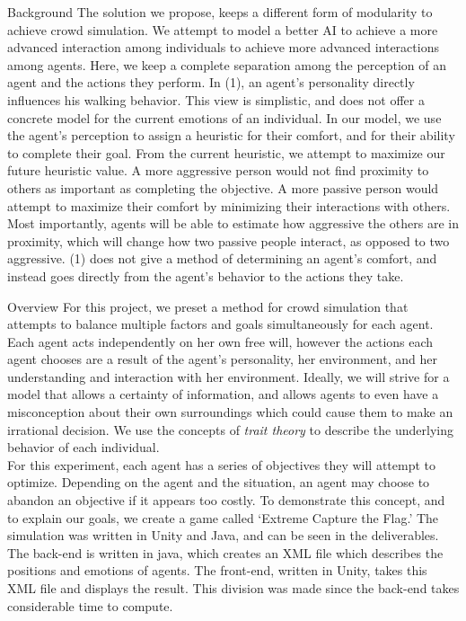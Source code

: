 \documentclass[11pt]{article}
\begin{document}
\begin{section}{Background}
The solution we propose, keeps a different form of modularity to achieve crowd simulation. We attempt to model a better AI to achieve a more advanced interaction among individuals to achieve more advanced interactions among agents. Here, we keep a complete separation among the perception of an agent and the actions they perform. In (1), an agent's personality directly influences his walking behavior. This view is simplistic, and does not offer a concrete model for the current emotions of an individual. In our model, we use the agent's perception to assign a heuristic for their comfort, and for their ability to complete their goal. From the current heuristic, we attempt to maximize our future heuristic value. A more aggressive person would not find proximity to others as important as completing the objective. A more passive person would attempt to maximize their comfort by minimizing their interactions with others. Most importantly, agents will be able to estimate how aggressive the others are in proximity, which will change how two passive people interact, as opposed to two aggressive. (1) does not give a method of determining an agent's comfort, and instead goes directly from the agent's behavior to the actions they take.\\
\end{section}

\begin{section}{Overview}
For this project, we preset a method for crowd simulation that attempts to balance multiple factors and goals simultaneously for each agent. Each agent acts independently on her own free will, however the actions each agent chooses are a result of the agent's personality, her environment, and her understanding and interaction with her environment. Ideally, we will strive for a model that allows a certainty of information, and allows agents to even have a misconception about their own surroundings which could cause them to make an irrational decision. We use the concepts of \emph{trait theory} to describe the underlying behavior of each individual.\\

For this experiment, each agent has a series of objectives they will attempt to optimize. Depending on the agent and the situation, an agent may choose to abandon an objective if it appears too costly. To demonstrate this concept, and to explain our goals, we create a game called `Extreme Capture the Flag.' The simulation was written in Unity and Java, and can be seen in the deliverables. The back-end is written in java, which creates an XML file which describes the positions and emotions of agents. The front-end, written in Unity, takes this XML file and displays the result. This division was made since the back-end takes considerable time to compute.
\end{section}
\end{document}
